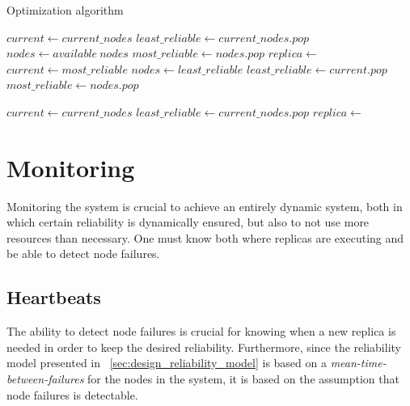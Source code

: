 \documentclass{cslthse-msc}
\begin{document}
\begin{algorithm} 
	\caption{Optimization algorithm} \label{alg:optimization}
	\begin{algorithmic}[1]
	\Do 
		\State $current\gets current\_nodes$
		\State $least\_reliable\gets current\_nodes.pop$
		\State $nodes\gets available\ nodes$
		\State $most\_reliable\gets nodes.pop$
		\State
			\State $replica\gets $
			\State
			\State
			\State
			\State $current\gets most\_reliable$
			\State $nodes\gets least\_reliable$
			\State $least\_reliable\gets current.pop$
			\State $most\_reliable\gets nodes.pop$
		\EndIf
	\State
	
\Statex{}
	\Do 
		\State $current\gets current\_nodes$
		\State $least\_reliable\gets current\_nodes.pop$
			\State $replica\gets $
			\State
		\EndIf
	\end{algorithmic}
\end{algorithm}

\section{Monitoring} \label{subsec:design_monitoring}
Monitoring the system is crucial to achieve an entirely dynamic system, both in which certain reliability is dynamically ensured, but also to not use more resources than necessary. One must know both where replicas are executing and be able to detect node failures.

\subsection{Heartbeats} \label{subsec:heartbeats}
The ability to detect node failures is crucial for knowing when a new replica is needed in order to keep the desired reliability. Furthermore, since the reliability model presented in ~\cref{sec:design_reliability_model} is based on a \emph{mean-time-between-failures} for the nodes in the system, it is based on the assumption that node failures is detectable. 
\end{document}
